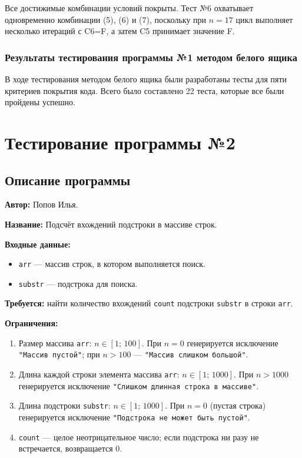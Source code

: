 \documentclass{article}[14pt]
\begin{document}
Все достижимые комбинации условий покрыты. Тест №6 охватывает одновременно комбинации (5), (6) и (7), 
поскольку при $n=17$ цикл выполняет несколько итераций с C6=F, а затем C5 принимает значение F.

\subsubsection{Результаты тестирования программы №1 методом белого ящика}

В ходе тестирования методом белого ящика были разработаны тесты для пяти критериев покрытия кода. Всего было составлено 22 теста,
которые все были пройдены успешно.

\pagebreak

\section{Тестирование программы №2}

\subsection{Описание программы}

\noindent \textbf{Автор:} Попов Илья.

\noindent \textbf{Название:} Подсчёт вхождений подстроки в массиве строк.

\noindent \textbf{Входные данные:}
\begin{itemize}
    \item \texttt{arr} --- массив строк, в котором выполняется поиск.
    \item \texttt{substr} --- подстрока для поиска.
\end{itemize}


\noindent \textbf{Требуется:} найти количество вхождений \texttt{count} подстроки \texttt{substr} в строки \texttt{arr}.

\noindent \textbf{Ограничения:}
\begin{enumerate}
    \item Размер массива \texttt{arr}: $n \in [1;\,100]$. При $n = 0$ генерируется исключение \texttt{"Массив пустой"}; при $n > 100$ --- \texttt{"Массив слишком большой"}.
    \item Длина каждой строки элемента массива \texttt{arr}: $n \in [1;\,1000]$. При $n > 1000$ генерируется исключение \texttt{"Слишком длинная строка в массиве"}.
    \item Длина подстроки \texttt{substr}: $n \in [1;\,1000]$. При $n = 0$ (пустая строка) генерируется исключение \texttt{"Подстрока не может быть пустой"}.
    \item \texttt{count} --- целое неотрицательное число; если подстрока ни разу не встречается, возвращается $0$.
\end{enumerate}
\end{document}
